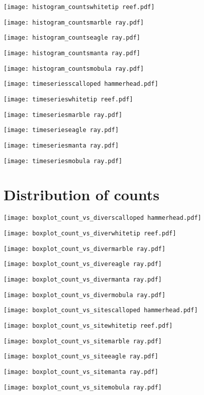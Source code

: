 \documentclass[a4paper]{article}
\begin{document}
\texttt{[image: histogram\_countswhitetip reef.pdf]}

\texttt{[image: histogram\_countsmarble ray.pdf]}

\texttt{[image: histogram\_countseagle ray.pdf]}

\texttt{[image: histogram\_countsmanta ray.pdf]}

\texttt{[image: histogram\_countsmobula ray.pdf]}%

\texttt{[image: timeseriesscalloped hammerhead.pdf]}

\texttt{[image: timeserieswhitetip reef.pdf]}

\texttt{[image: timeseriesmarble ray.pdf]}

\texttt{[image: timeserieseagle ray.pdf]}

\texttt{[image: timeseriesmanta ray.pdf]}

\texttt{[image: timeseriesmobula ray.pdf]}




\clearpage



\section{Distribution of counts}


\texttt{[image: boxplot\_count\_vs\_diverscalloped hammerhead.pdf]}

\texttt{[image: boxplot\_count\_vs\_diverwhitetip reef.pdf]}

\texttt{[image: boxplot\_count\_vs\_divermarble ray.pdf]}

\texttt{[image: boxplot\_count\_vs\_divereagle ray.pdf]}

\texttt{[image: boxplot\_count\_vs\_divermanta ray.pdf]}

\texttt{[image: boxplot\_count\_vs\_divermobula ray.pdf]}


\texttt{[image: boxplot\_count\_vs\_sitescalloped hammerhead.pdf]}

\texttt{[image: boxplot\_count\_vs\_sitewhitetip reef.pdf]}

\texttt{[image: boxplot\_count\_vs\_sitemarble ray.pdf]}

\texttt{[image: boxplot\_count\_vs\_siteeagle ray.pdf]}

\texttt{[image: boxplot\_count\_vs\_sitemanta ray.pdf]}

\texttt{[image: boxplot\_count\_vs\_sitemobula ray.pdf]}
\end{document}
